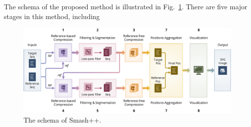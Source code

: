 


The schema of the proposed method is illustrated in Fig.~\ref{fig.schema}. There are five major stages in this method, including 

\begin{figure}[!h]
\includegraphics[width=\linewidth]{schema.pdf}
\caption{The schema of Smash++.}
\label{fig.schema}
\end{figure}

